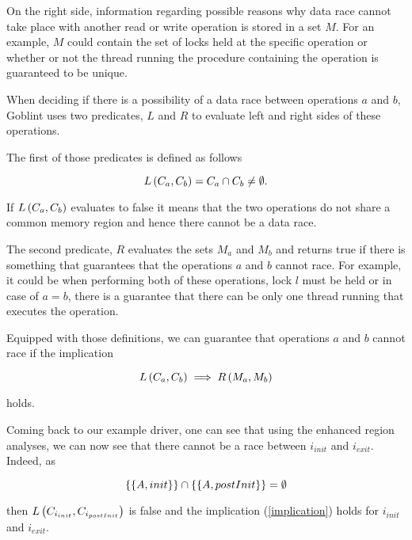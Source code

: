 \documentclass[..thesis.tex]{subfiles}
\begin{document}
On the right side, information regarding possible reasons why data race cannot take place with another read or write operation is stored in a set $M$. For an example, $M$ could contain the set of locks held at the specific operation or whether or not the thread running the procedure containing the operation is guaranteed to be unique.

When deciding if there is a possibility of a data race between operations $a$ and $b$, Goblint uses two predicates, $L$ and $R$ to evaluate left and right sides of these operations. 

The first of those predicates is defined as follows

\begin{equation*}
L \left( C_a, C_b \right) =  C_a \cap C_b \neq \emptyset \text{.}
\end{equation*}

If $L \left( C_a, C_b \right)$ evaluates to false it means that the two operations do not share a common memory region and hence there cannot be a data race. 

The second predicate, $R$ evaluates the sets $M_a$ and $M_b$ and returns true if there is something that guarantees that the operations $a$ and $b$ cannot race. For example, it could be when performing both of these operations, lock $l$ must be held or in case of $a=b$, there is a guarantee that there can be only one thread running that executes the operation.

Equipped with those definitions, we can guarantee that operations $a$ and $b$ cannot race if the implication

\begin{equation}
\label{implication}
L \left( C_a, C_b \right) \implies R \left( M_a, M_b \right)  
\end{equation}

holds.

Coming back to our example driver, one can see that using the enhanced region analyses, we can now see that there cannot be a race between $i_{init}$ and $i_{exit}$. Indeed, as


\begin{equation*}
 \left\lbrace \left\lbrace A, init \right\rbrace \right\rbrace \cap  \left\lbrace \left\lbrace A, postInit \right\rbrace \right\rbrace = \emptyset
\end{equation*}

then $L \left( C_{i_{init}}, C_{i_{postInit}} \right)$ is false and the implication (\ref{implication}) holds for $i_{init}$ and $i_{exit}$.
\end{document}

